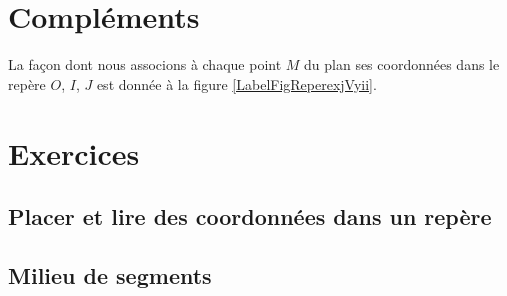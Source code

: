 \section{Compléments}

La façon dont nous associons à chaque point \( M\) du plan ses coordonnées dans le repère \( O\), \( I\), \( J\) est donnée à la figure \ref{LabelFigReperexjVyii}.
\newcommand{\CaptionFigReperexjVyii}{Lire les coordonnées du point \( M\) dans le repère \( OIJ\).}



\section{Exercices}


\subsection{Placer et lire des coordonnées dans un repère}


\subsection{Milieu de segments}


